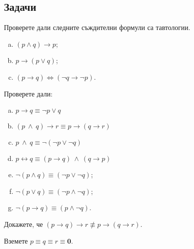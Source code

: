 \subsection{Задачи}

\begin{problem}
  Проверете дали следните съждителни формули са тавтологии.
  \begin{enumerate}[a)]
  \item
    $(p\wedge q)\rightarrow p$;
  \item
    $p\rightarrow(p\vee q)$;
  \item
    $(p\rightarrow q) \iff (\neg q \rightarrow \neg p)$.
  \end{enumerate}
\end{problem}  
\begin{problem}
  Проверете дали:
  \begin{enumerate}[a)]
  \item
    $p\rightarrow q \equiv \neg p \vee q$
  \item
    $(p\ \wedge\ q) \rightarrow r \equiv p \rightarrow (q\rightarrow r)$
  \item
    $p\ \wedge\ q \equiv \neg(\neg p \vee \neg q)$
  \item
    $p \leftrightarrow q \equiv (p\rightarrow q)\ \wedge\ (q\rightarrow p)$
  \item
    $\neg(p\wedge q) \equiv (\neg p \vee \neg q)$;
  \item
    $\neg(p\vee q) \equiv (\neg p \wedge \neg q)$;
  \item
    $\neg(p\rightarrow q) \equiv (p\wedge \neg q)$.
  \end{enumerate}
\end{problem}

\begin{framed}
\begin{problem}
  Докажете, че $(p\rightarrow q)\rightarrow r \not\equiv p\rightarrow (q\rightarrow r)$.
\end{problem}
\end{framed}
\begin{hint}
  Вземете $p \equiv q \equiv r \equiv \mathbf{0}$.
\end{hint}



